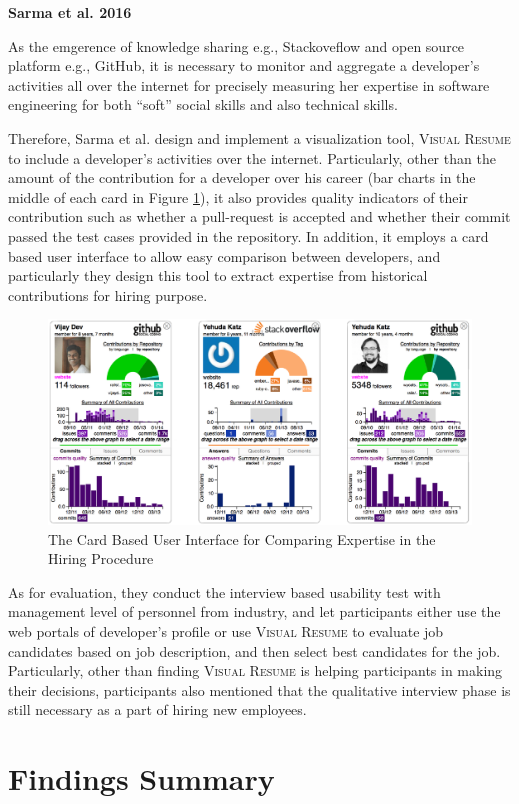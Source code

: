 \textbf{Sarma et al. 2016}

As the emgerence of knowledge sharing e.g., Stackoveflow and open source platform e.g., GitHub, it is necessary to monitor and aggregate a developer's activities all over the internet for precisely measuring her expertise in software engineering for both ``soft'' social skills and also technical skills.

Therefore, Sarma et al. design and implement a visualization tool, \textsc{Visual Resume} to include a developer's activities over the internet. Particularly, other than the amount of the contribution for a developer over his career (bar charts in the middle of each card in Figure \ref{vr}), it also provides quality indicators of their contribution such as whether a pull-request is accepted and whether their commit passed the test cases provided in the repository. In addition, it employs a card based user interface to allow easy comparison between developers, and particularly they design this tool to extract expertise from historical contributions for hiring purpose.

\begin{figure}
\includegraphics[width = 0.8\columnwidth]{vr.pdf}
\centering
\caption{The Card Based User Interface for Comparing Expertise in the Hiring Procedure \cite{hiring2016sarma}}
\label{vr}
\end{figure}

As for evaluation, they conduct the interview based usability test with management level of personnel from industry, and let participants either use the web portals of developer's profile or use \textsc{Visual Resume} to evaluate job candidates based on job description, and then select best candidates for the job. Particularly, other than finding \textsc{Visual Resume} is helping participants in making their decisions, participants also mentioned that the qualitative interview phase is still necessary as a part of hiring new employees.

\section{Findings Summary}

